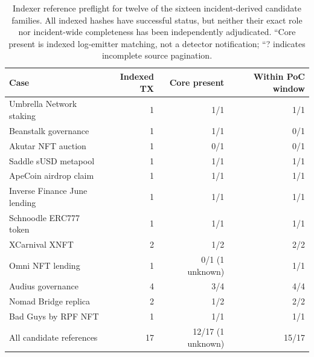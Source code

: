 \begin{table}[htbp]
\centering\small
\caption{Indexer reference preflight for twelve of the sixteen incident-derived candidate families. All indexed hashes have successful status, but neither their exact role nor incident-wide completeness has been independently adjudicated. ``Core present is indexed log-emitter matching, not a detector notification; ``? indicates incomplete source pagination.}
\label{tab:refpreflight}
\begin{tabularx}{\linewidth}{@{}>{\raggedright\arraybackslash}X r r r@{}}
\toprule
Case & Indexed TX & Core present & Within PoC window\\
\midrule
Umbrella Network staking & 1 & 1/1 & 1/1\\
Beanstalk governance & 1 & 1/1 & 0/1\\
Akutar NFT auction & 1 & 0/1 & 0/1\\
Saddle sUSD metapool & 1 & 1/1 & 1/1\\
ApeCoin airdrop claim & 1 & 1/1 & 1/1\\
Inverse Finance June lending & 1 & 1/1 & 1/1\\
Schnoodle ERC777 token & 1 & 1/1 & 1/1\\
XCarnival XNFT & 2 & 1/2 & 2/2\\
Omni NFT lending & 1 & 0/1 (1 unknown) & 1/1\\
Audius governance & 4 & 3/4 & 4/4\\
Nomad Bridge replica & 2 & 1/2 & 2/2\\
Bad Guys by RPF NFT & 1 & 1/1 & 1/1\\
\midrule
All candidate references & 17 & 12/17 (1 unknown) & 15/17\\
\bottomrule
\end{tabularx}
\end{table}
